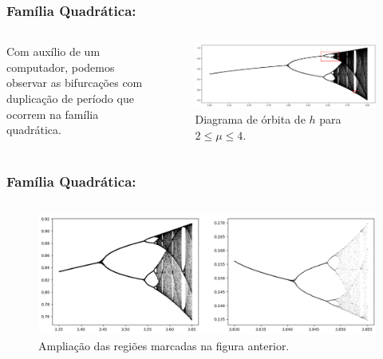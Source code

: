 
\begin{frame}
\vspace{5pt}
\frametitle{Família Quadrática: \subsecname}
\begin{columns}
\column{\dimexpr\paperwidth-15pt}

Com auxílio de um computador, podemos observar as bifurcações com duplicação de período que ocorrem na família quadrática.

\begin{figure}[!htb]
\centering
\includegraphics[scale=0.4]{images/period-doubling-and-zoom1.png}
\caption{Diagrama de órbita de $h$ para $2 \leq \mu \leq 4$.}
\end{figure}

\end{columns}
\end{frame}


\begin{frame}
\vspace{5pt}
\frametitle{Família Quadrática: \subsecname}
\begin{columns}
\column{\dimexpr\paperwidth-15pt}

\begin{figure}[H]
\centering
\includegraphics[scale=0.4]{images/period-doubling-and-zoom2.png}
\caption{Ampliação das regiões marcadas na figura anterior.}
\end{figure}

\end{columns}
\end{frame}
